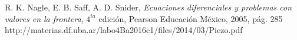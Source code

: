 \documentclass[twoside,twocolumn,a4paper]{article}
\begin{document}
\newpage
\begin{thebibliography}{99} %


 R. K. Nagle, E. B. Saff, A. D. Snider, \textit{Ecuaciones diferenciales y problemas con valores en la frontera}, $4^{ta}$ edici\'on, Pearson Educaci\'on M\'exico, 2005, p\'ag. 285
 http://materias.df.uba.ar/labo4Ba2016c1/files/2014/03/Piezo.pdf 
 
\end{thebibliography}


\end{document}
